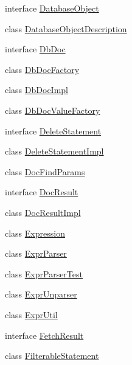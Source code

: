 \begin{DoxyCompactItemize}
\item 
interface \mbox{\hyperlink{interfacecom_1_1mysql_1_1cj_1_1xdevapi_1_1_database_object}{Database\+Object}}
\item 
class \mbox{\hyperlink{classcom_1_1mysql_1_1cj_1_1xdevapi_1_1_database_object_description}{Database\+Object\+Description}}
\item 
interface \mbox{\hyperlink{interfacecom_1_1mysql_1_1cj_1_1xdevapi_1_1_db_doc}{Db\+Doc}}
\item 
class \mbox{\hyperlink{classcom_1_1mysql_1_1cj_1_1xdevapi_1_1_db_doc_factory}{Db\+Doc\+Factory}}
\item 
class \mbox{\hyperlink{classcom_1_1mysql_1_1cj_1_1xdevapi_1_1_db_doc_impl}{Db\+Doc\+Impl}}
\item 
class \mbox{\hyperlink{classcom_1_1mysql_1_1cj_1_1xdevapi_1_1_db_doc_value_factory}{Db\+Doc\+Value\+Factory}}
\item 
interface \mbox{\hyperlink{interfacecom_1_1mysql_1_1cj_1_1xdevapi_1_1_delete_statement}{Delete\+Statement}}
\item 
class \mbox{\hyperlink{classcom_1_1mysql_1_1cj_1_1xdevapi_1_1_delete_statement_impl}{Delete\+Statement\+Impl}}
\item 
class \mbox{\hyperlink{classcom_1_1mysql_1_1cj_1_1xdevapi_1_1_doc_find_params}{Doc\+Find\+Params}}
\item 
interface \mbox{\hyperlink{interfacecom_1_1mysql_1_1cj_1_1xdevapi_1_1_doc_result}{Doc\+Result}}
\item 
class \mbox{\hyperlink{classcom_1_1mysql_1_1cj_1_1xdevapi_1_1_doc_result_impl}{Doc\+Result\+Impl}}
\item 
class \mbox{\hyperlink{classcom_1_1mysql_1_1cj_1_1xdevapi_1_1_expression}{Expression}}
\item 
class \mbox{\hyperlink{classcom_1_1mysql_1_1cj_1_1xdevapi_1_1_expr_parser}{Expr\+Parser}}
\item 
class \mbox{\hyperlink{classcom_1_1mysql_1_1cj_1_1xdevapi_1_1_expr_parser_test}{Expr\+Parser\+Test}}
\item 
class \mbox{\hyperlink{classcom_1_1mysql_1_1cj_1_1xdevapi_1_1_expr_unparser}{Expr\+Unparser}}
\item 
class \mbox{\hyperlink{classcom_1_1mysql_1_1cj_1_1xdevapi_1_1_expr_util}{Expr\+Util}}
\item 
interface \mbox{\hyperlink{interfacecom_1_1mysql_1_1cj_1_1xdevapi_1_1_fetch_result}{Fetch\+Result}}
\item 
class \mbox{\hyperlink{classcom_1_1mysql_1_1cj_1_1xdevapi_1_1_filterable_statement}{Filterable\+Statement}}

\end{DoxyCompactItemize}

